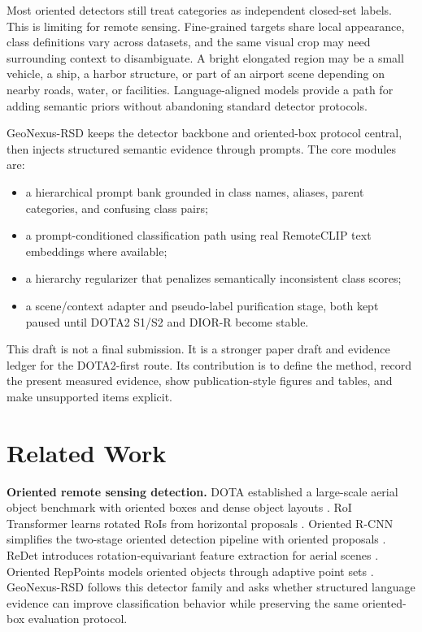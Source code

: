 \documentclass[10pt]{article}
\begin{document}
Most oriented detectors still treat categories as independent closed-set labels. This is limiting for remote sensing. Fine-grained targets share local appearance, class definitions vary across datasets, and the same visual crop may need surrounding context to disambiguate. A bright elongated region may be a small vehicle, a ship, a harbor structure, or part of an airport scene depending on nearby roads, water, or facilities. Language-aligned models provide a path for adding semantic priors without abandoning standard detector protocols.

GeoNexus-RSD keeps the detector backbone and oriented-box protocol central, then injects structured semantic evidence through prompts. The core modules are:
\begin{itemize}
\item a hierarchical prompt bank grounded in class names, aliases, parent categories, and confusing class pairs;
\item a prompt-conditioned classification path using real RemoteCLIP text embeddings where available;
\item a hierarchy regularizer that penalizes semantically inconsistent class scores;
\item a scene/context adapter and pseudo-label purification stage, both kept paused until DOTA2 S1/S2 and DIOR-R become stable.
\end{itemize}

This draft is not a final submission. It is a stronger paper draft and evidence ledger for the DOTA2-first route. Its contribution is to define the method, record the present measured evidence, show publication-style figures and tables, and make unsupported items explicit.

\section{Related Work}

\textbf{Oriented remote sensing detection.}
DOTA established a large-scale aerial object benchmark with oriented boxes and dense object layouts \cite{xia2018dota}. RoI Transformer learns rotated RoIs from horizontal proposals \cite{ding2019roit}. Oriented R-CNN simplifies the two-stage oriented detection pipeline with oriented proposals \cite{xie2021orientedrcnn}. ReDet introduces rotation-equivariant feature extraction for aerial scenes \cite{han2021redet}. Oriented RepPoints models oriented objects through adaptive point sets \cite{li2022orientedreppoints}. GeoNexus-RSD follows this detector family and asks whether structured language evidence can improve classification behavior while preserving the same oriented-box evaluation protocol.
\end{document}
